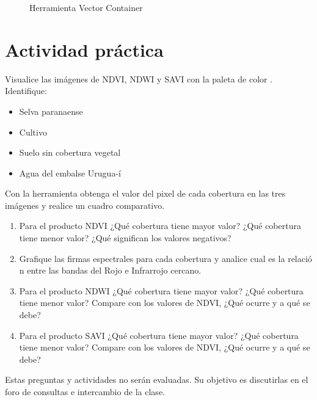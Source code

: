 \begin{figure}[h!]
    \centering
    \caption{Herramienta Vector Container}
    \label{fig:vector-container}
\end{figure}



%






\section{Actividad práctica}

Visualice las imágenes de NDVI, NDWI y SAVI con la paleta de color . Identifique:

  \begin{itemize}
  \item Selva paranaense
  \item Cultivo
  \item Suelo sin cobertura vegetal
  \item Agua del embalse Urugua-í
  \end{itemize}

Con la herramienta  obtenga el valor del pixel de cada cobertura en las tres imágenes y realice un cuadro comparativo.

\begin{enumerate}
\item Para el producto NDVI ¿Qué cobertura tiene mayor valor? ¿Qué cobertura tiene menor valor? ¿Qué significan los valores negativos?
\item Grafique las firmas espectrales para cada cobertura y analice cual es la relació n entre las bandas del Rojo e Infrarrojo cercano.
\item Para el producto NDWI ¿Qué cobertura tiene mayor valor? ¿Qué cobertura tiene menor valor? Compare con los valores de NDVI, ¿Qué ocurre y a qué se debe?
\item Para el producto SAVI ¿Qué cobertura tiene mayor valor? ¿Qué cobertura tiene menor valor? Compare con los valores de NDVI, ¿Qué ocurre y a qué se debe?

\end{enumerate}



Estas preguntas y actividades no serán evaluadas. Su objetivo es discutirlas en el foro de consultas e intercambio de la clase.



